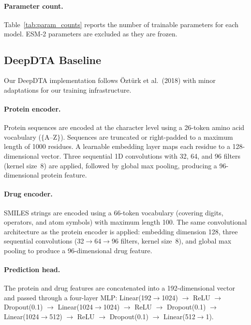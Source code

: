 \documentclass[11pt]{article}
\begin{document}
\paragraph{Parameter count.}
Table~\ref{tab:param_counts} reports the number of trainable parameters for each model. ESM-2 parameters are excluded as they are frozen.

\subsection{DeepDTA Baseline}

Our DeepDTA implementation follows \"{O}zt\"{u}rk et al.\ (2018) with minor adaptations for our training infrastructure.

\paragraph{Protein encoder.}
Protein sequences are encoded at the character level using a 26-token amino acid vocabulary ($\{$A--Z$\}$). Sequences are truncated or right-padded to a maximum length of 1000 residues. A learnable embedding layer maps each residue to a 128-dimensional vector. Three sequential 1D convolutions with 32, 64, and 96 filters (kernel size~8) are applied, followed by global max pooling, producing a 96-dimensional protein feature.

\paragraph{Drug encoder.}
SMILES strings are encoded using a 66-token vocabulary (covering digits, operators, and atom symbols) with maximum length 100. The same convolutional architecture as the protein encoder is applied: embedding dimension 128, three sequential convolutions (32$\to$64$\to$96 filters, kernel size~8), and global max pooling to produce a 96-dimensional drug feature.

\paragraph{Prediction head.}
The protein and drug features are concatenated into a 192-dimensional vector and passed through a four-layer MLP: Linear(192$\to$1024) $\to$ ReLU $\to$ Dropout(0.1) $\to$ Linear(1024$\to$1024) $\to$ ReLU $\to$ Dropout(0.1) $\to$ Linear(1024$\to$512) $\to$ ReLU $\to$ Dropout(0.1) $\to$ Linear(512$\to$1).
\end{document}
